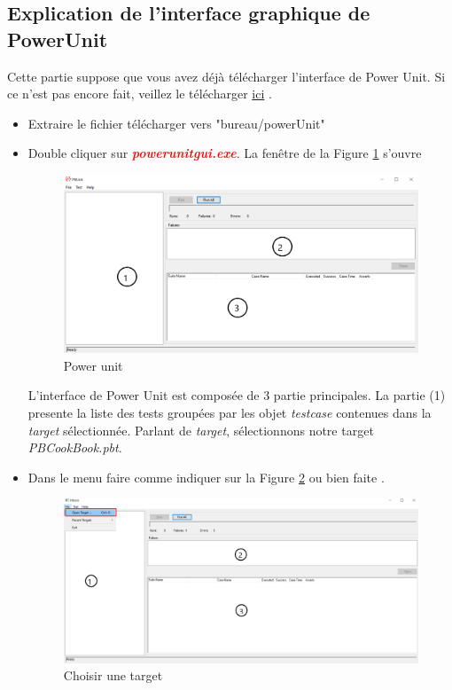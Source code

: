 \documentclass[french]{article}
\theoremstyle{definition}
\begin{document}
\subsection{Explication de l'interface graphique de PowerUnit}
Cette partie suppose que vous avez déjà télécharger l'interface de Power  Unit. Si ce n'est pas encore fait, veillez le télécharger \href{https://github.com/mahugnon/PowerUnitHonore/releases/download/v3.1.2/powerUnit.zip}{ici} .
\begin{itemize}
    \item  Extraire le  fichier télécharger  vers "bureau/powerUnit"
    \item  Double cliquer sur \textbf{\textit{\textcolor{red}{powerunitgui.exe}}}. 
    La fenêtre de la Figure \ref{fig:emptyPowerUnit} s'ouvre
    \begin{figure}[!htbp]
        \begin{center}
        \includegraphics[width=.8\linewidth]{./emptyPowerUnit.png}
        \caption{Power unit}
        \label{fig:emptyPowerUnit}
        \end{center}
      \end{figure}
   L'interface de Power Unit est composée de 3 partie principales.
 La partie (1) presente la liste des tests groupées par les objet \textit{testcase}  contenues dans la \textit{target} sélectionnée.
Parlant de \textit{target}, sélectionnons notre target \textit{PBCookBook.pbt}.
\item  Dans le menu faire  comme indiquer sur la Figure \ref{fig:openTarget} ou bien faite .

\begin{figure}[!htbp]
    \begin{center}
    \includegraphics[width=.8\linewidth]{./openTarget.png}
    \caption{Choisir une target}
    \label{fig:openTarget}
    \end{center}
  \end{figure}


\end{itemize}
\end{document}
